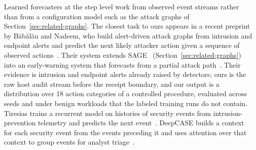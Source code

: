 Learned forecasters at the step level work from observed event streams
rather than from a configuration model such as the attack graphs of
Section~\ref{sec:related-graphs}. The closest task to ours appears
in a recent preprint by B\u{a}b\u{a}l\u{a}u and Nadeem, who build
alert-driven attack graphs from intrusion and endpoint alerts and
predict the next likely attacker action given a sequence of observed
actions~\cite{babalau2024forecasting}.
Their system extends SAGE~\cite{nadeem2022alert}
(Section~\ref{sec:related-graphs}) into an early-warning system that
forecasts from a partial attack path~\cite{babalau2024forecasting}.
Their evidence is
intrusion and endpoint alerts already raised by detectors; ours is the raw host audit stream
before the receipt boundary, and our output is a distribution over 18
action categories of a controlled procedure, evaluated across seeds and
under benign workloads that the labeled training runs do not contain.
Tiresias trains a recurrent model on histories of
security events from intrusion-prevention telemetry and predicts the
next event~\cite{shen2018tiresias}. DeepCASE builds a context for each
security event from the events preceding it and uses attention over
that context to group events for analyst triage~\cite{vanede2022deepcase}.
